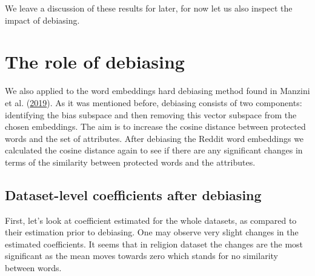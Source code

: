 \documentclass[12pt,]{book}
\begin{document}
We leave a discussion of these results for later, for now let us also
inspect the impact of debiasing.

\chapter{The role of debiasing}\label{the-role-of-debiasing}

We also applied to the word embeddings hard debiasing method found in
Manzini et al.
(\protect\hyperlink{ref-Manzini2019blackToCriminal}{2019}). As it was
mentioned before, debiasing consists of two components: identifying the
bias subspace and then removing this vector subspace from the chosen
embeddings. The aim is to increase the cosine distance between protected
words and the set of attributes. After debiasing the Reddit word
embeddings we calculated the cosine distance again to see if there are
any significant changes in terms of the similarity between protected
words and the attributes.

\section{Dataset-level coefficients after
debiasing}\label{dataset-level-coefficients-after-debiasing}

First, let's look at coefficient estimated for the whole datasets, as
compared to their estimation prior to debiasing. One may observe very
slight changes in the estimated coeﬀicients. It seems that in religion
dataset the changes are the most significant as the mean moves towards
zero which stands for no similarity between words.
\end{document}
